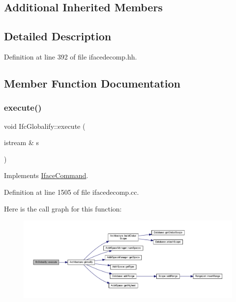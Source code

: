 \subsection*{Additional Inherited Members}


\subsection{Detailed Description}


Definition at line 392 of file ifacedecomp.\+hh.



\subsection{Member Function Documentation}
\mbox{\label{class_ifc_globalify_a30fe295b7731c4161efb170abbd90c10}} 
\subsubsection{\texorpdfstring{execute()}{execute()}}
{\footnotesize\ttfamily void Ifc\+Globalify\+::execute (\begin{DoxyParamCaption}\item[{istream \&}]{s }\end{DoxyParamCaption})\hspace{0.3cm}{\ttfamily [virtual]}}



Implements \mbox{\hyperlink{class_iface_command_af10e29cee2c8e419de6efe9e680ad201}{Iface\+Command}}.



Definition at line 1505 of file ifacedecomp.\+cc.

Here is the call graph for this function\+:
\nopagebreak
\begin{figure}[H]
\begin{center}
\leavevmode
\includegraphics[width=350pt]{class_ifc_globalify_a30fe295b7731c4161efb170abbd90c10_cgraph}
\end{center}
\end{figure}


